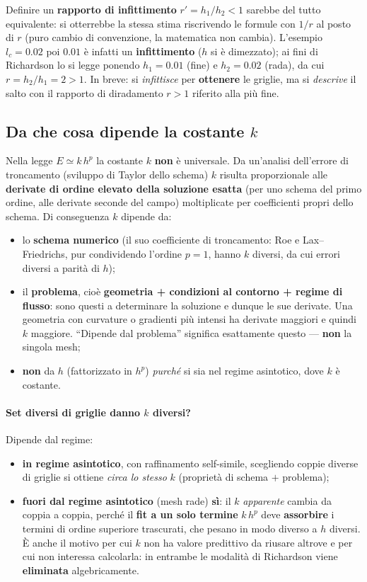 Definire un \textbf{rapporto di infittimento} $r'=h_1/h_2<1$ sarebbe del tutto equivalente: si
otterrebbe la stessa stima riscrivendo le formule con $1/r$ al posto di $r$ (puro cambio di
convenzione, la matematica non cambia). L'esempio $l_c=0.02$ poi $0.01$ è infatti un
\textbf{infittimento} ($h$ si è dimezzato); ai fini di Richardson lo si legge ponendo $h_1=0.01$
(fine) e $h_2=0.02$ (rada), da cui $r=h_2/h_1=2>1$. In breve: si \emph{infittisce} per
\textbf{ottenere} le griglie, ma si \emph{descrive} il salto con il rapporto di diradamento $r>1$
riferito alla più fine.

\subsection{Da che cosa dipende la costante $k$}

Nella legge $E\simeq k\,h^p$ la costante $k$ \textbf{non} è universale. Da un'analisi dell'errore di
troncamento (sviluppo di Taylor dello schema) $k$ risulta proporzionale alle \textbf{derivate di
ordine elevato della soluzione esatta} (per uno schema del primo ordine, alle derivate seconde del
campo) moltiplicate per coefficienti propri dello schema. Di conseguenza $k$ dipende da:
\begin{itemize}
  \item lo \textbf{schema numerico} (il suo coefficiente di troncamento: Roe e Lax--Friedrichs, pur
    condividendo l'ordine $p=1$, hanno $k$ diversi, da cui errori diversi a parità di $h$);
  \item il \textbf{problema}, cioè \textbf{geometria + condizioni al contorno + regime di flusso}:
    sono questi a determinare la soluzione e dunque le sue derivate. Una geometria con curvature o
    gradienti più intensi ha derivate maggiori e quindi $k$ maggiore. ``Dipende dal problema''
    significa esattamente questo --- \textbf{non} la singola mesh;
  \item \textbf{non} da $h$ (fattorizzato in $h^p$) \emph{purché} si sia nel regime asintotico, dove
    $k$ è costante.
\end{itemize}

\paragraph{Set diversi di griglie danno $k$ diversi?} Dipende dal regime:
\begin{itemize}
  \item \textbf{in regime asintotico}, con raffinamento self-simile, scegliendo coppie diverse di
    griglie si ottiene \emph{circa lo stesso} $k$ (proprietà di schema $+$ problema);
  \item \textbf{fuori dal regime asintotico} (mesh rade) \textbf{sì}: il $k$ \emph{apparente} cambia
    da coppia a coppia, perché il \textbf{fit a un solo termine} $k\,h^p$ deve \textbf{assorbire} i
    termini di ordine superiore trascurati, che pesano in modo diverso a $h$ diversi. È anche il
    motivo per cui $k$ non ha valore predittivo da riusare altrove e per cui non interessa calcolarla:
    in entrambe le modalità di Richardson viene \textbf{eliminata} algebricamente.
\end{itemize}

